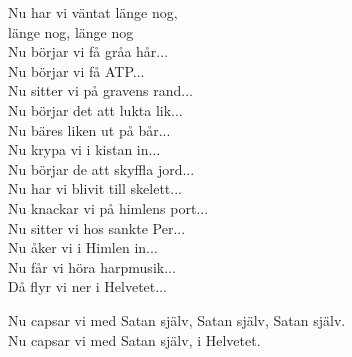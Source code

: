 \vspace{10pt}
\revrpt Nu har vi väntat länge nog,\\
länge nog, länge nog\rpt\\
Nu börjar vi få gråa hår...\\
Nu börjar vi få ATP...\\
Nu sitter vi på gravens rand...\\
Nu börjar det att lukta lik...\\
Nu bäres liken ut på bår...\\
Nu krypa vi i kistan in...\\
Nu börjar de att skyffla jord...\\
Nu har vi blivit till skelett...\\
Nu knackar vi på himlens port...\\
Nu sitter vi hos sankte Per...\\
Nu åker vi i Himlen in...\\
Nu får vi höra harpmusik...\\
Då flyr vi ner i Helvetet...\par
\vspace{10pt}
Nu capsar vi med Satan själv, Satan själv, Satan själv.\\
Nu capsar vi med Satan själv, i Helvetet.
